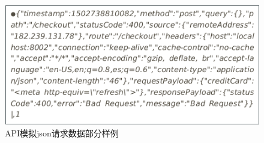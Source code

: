\begin{figure}[!h]
    \centering
     \includegraphics[scale=0.4]{Figs/json.png}
    \caption{API模拟json请求数据部分样例}
    \label{fig:json_sample}
\end{figure}
